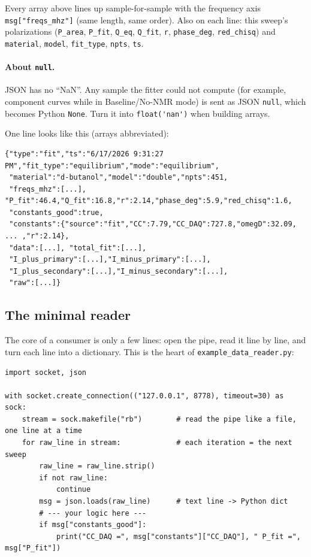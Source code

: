 \documentclass[11pt]{article}
\newcommand{\code}[1]{\lstinline[style=plain]|#1|}
\begin{document}
Every array above lines up sample-for-sample with the frequency axis
\code{msg["freqs_mhz"]} (same length, same order). Also on each line: this sweep's
polarizations (\code{P_area}, \code{P_fit}, \code{Q_eq}, \code{Q_fit}, \code{r},
\code{phase_deg}, \code{red_chisq}) and \code{material}, \code{model}, \code{fit_type},
\code{npts}, \code{ts}.

\paragraph{About \code{null}.} JSON has no ``NaN''. Any sample the fitter could not compute
(for example, component curves while in Baseline/No-NMR mode) is sent as JSON \code{null},
which becomes Python \code{None}. Turn it into \code{float('nan')} when building arrays.

One line looks like this (arrays abbreviated):
\begin{lstlisting}[style=plain]
{"type":"fit","ts":"6/17/2026 9:31:27 PM","fit_type":"equilibrium","mode":"equilibrium",
 "material":"d-butanol","model":"double","npts":451,
 "freqs_mhz":[...], "P_fit":46.4,"Q_fit":16.8,"r":2.14,"phase_deg":5.9,"red_chisq":1.6,
 "constants_good":true,
 "constants":{"source":"fit","CC":7.79,"CC_DAQ":727.8,"omegD":32.09, ... ,"r":2.14},
 "data":[...], "total_fit":[...],
 "I_plus_primary":[...],"I_minus_primary":[...],
 "I_plus_secondary":[...],"I_minus_secondary":[...],
 "raw":[...]}
\end{lstlisting}

\subsection{The minimal reader}

The core of a consumer is only a few lines: open the pipe, read it line by line, and turn each
line into a dictionary. This is the heart of \code{example_data_reader.py}:

\begin{lstlisting}
import socket, json

with socket.create_connection(("127.0.0.1", 8778), timeout=30) as sock:
    stream = sock.makefile("rb")        # read the pipe like a file, one line at a time
    for raw_line in stream:             # each iteration = the next sweep
        raw_line = raw_line.strip()
        if not raw_line:
            continue
        msg = json.loads(raw_line)      # text line -> Python dict
        # --- your logic here ---
        if msg["constants_good"]:
            print("CC_DAQ =", msg["constants"]["CC_DAQ"], " P_fit =", msg["P_fit"])
\end{lstlisting}
\end{document}
